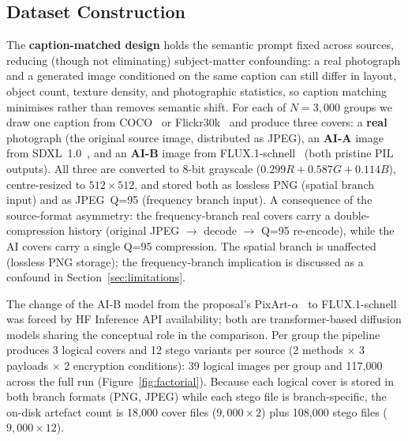 \documentclass[10pt,twocolumn,a4paper]{article}
\begin{document}
\subsection{Dataset Construction}
\label{sec:dataset}
The \textbf{caption-matched design} holds the semantic prompt fixed across sources, reducing (though not eliminating) subject-matter confounding: a real photograph and a generated image conditioned on the same caption can still differ in layout, object count, texture density, and photographic statistics, so caption matching minimises rather than removes semantic shift. For each of $N\!=\!3{,}000$ groups we draw one caption from COCO~\cite{coco2014} or Flickr30k~\cite{flickr30k2014} and produce three covers: a \textbf{real} photograph (the original source image, distributed as JPEG), an \textbf{AI-A} image from SDXL~1.0~\cite{sdxl2023}, and an \textbf{AI-B} image from FLUX.1-schnell~\cite{flux2024} (both pristine PIL outputs). All three are converted to 8-bit grayscale ($0.299R\!+\!0.587G\!+\!0.114B$), centre-resized to $512\!\times\!512$, and stored both as lossless PNG (spatial branch input) and as JPEG~Q=95 (frequency branch input). A consequence of the source-format asymmetry: the frequency-branch real covers carry a double-compression history (original JPEG $\to$ decode $\to$ Q=95 re-encode), while the AI covers carry a single Q=95 compression. The spatial branch is unaffected (lossless PNG storage); the frequency-branch implication is discussed as a confound in Section~\ref{sec:limitations}.

The change of the AI-B model from the proposal's PixArt-$\alpha$~\cite{pixart2023} to FLUX.1-schnell was forced by HF Inference API availability; both are transformer-based diffusion models sharing the conceptual role in the comparison. Per group the pipeline produces 3 logical covers and 12 stego variants per source (2 methods $\times$ 3 payloads $\times$ 2 encryption conditions): 39 logical images per group and 117{,}000 across the full run (Figure~\ref{fig:factorial}). Because each logical cover is stored in both branch formats (PNG, JPEG) while each stego file is branch-specific, the on-disk artefact count is 18{,}000 cover files ($9{,}000\!\times\!2$) plus 108{,}000 stego files ($9{,}000\!\times\!12$).
\end{document}
